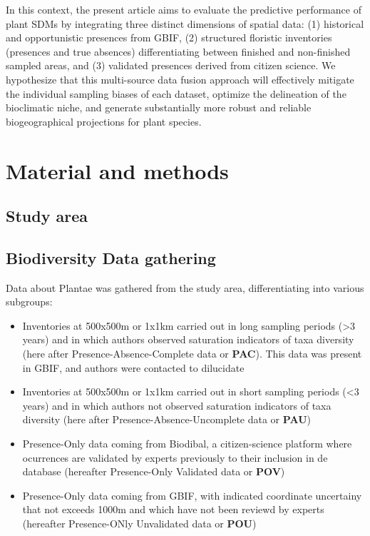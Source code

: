\documentclass{article}
\begin{document}
In this context, the present article aims to evaluate the predictive performance of plant SDMs by integrating three distinct dimensions of spatial data: (1) historical and opportunistic presences from GBIF, (2) structured floristic inventories (presences and true absences) differentiating between finished and non-finished sampled areas, and (3) validated presences derived from citizen science. We hypothesize that this multi-source data fusion approach will effectively mitigate the individual sampling biases of each dataset, optimize the delineation of the bioclimatic niche, and generate substantially more robust and reliable biogeographical projections for plant species.

\section{Material and methods}

\subsection{Study area}

\subsection{Biodiversity Data gathering}

Data about Plantae was gathered from the study area, differentiating into various subgroups:

\begin{itemize}
    \item Inventories at 500x500m or 1x1km carried out in long sampling periods (>3 years) and in which authors observed saturation indicators of taxa diversity (here after Presence-Absence-Complete data or \textbf{PAC}). This data was present in GBIF, and authors were contacted to dilucidate 
    \item Inventories at 500x500m or 1x1km carried out in short sampling periods (<3 years) and in which authors not observed saturation indicators of taxa diversity (here after Presence-Absence-Uncomplete data or \textbf{PAU})
    \item Presence-Only data coming from Biodibal, a citizen-science platform where ocurrences are validated by experts previously to their inclusion in de database (hereafter Presence-Only Validated data or \textbf{POV})
    \item Presence-Only data coming from GBIF, with indicated coordinate uncertainy that not exceeds 1000m and which have not been reviewd by experts (hereafter Presence-ONly Unvalidated data or \textbf{POU})
\end{itemize}
\end{document}
